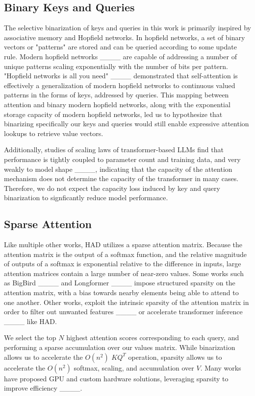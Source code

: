 \subsection{Binary Keys and Queries}
The selective binarization of keys and queries in this work is primarily inspired by associative memory and Hopfield networks.  In hopfield networks, a set of binary vectors or "patterns" are stored and can be queried according to some update rule.  Modern hopfield networks ____ are capable of addressing a number of unique patterns scaling exponentially with the number of bits per pattern. "Hopfield networks is all you need" ____ demonstrated that self-attention is effectively a generalization of modern hopfield networks to continuous valued patterns in the forms of keys, addressed by queries.  This mapping between attention and binary modern hopfield networks, along with the exponential storage capacity of modern hopfield networks, led us to hypothesize that binarizing specifically our keys and queries would still enable expressive attention lookups to retrieve value vectors.  \par Additionally, studies of scaling laws of transformer-based LLMs find that performance is tightly coupled to parameter count and training data, and very weakly to model shape ____, indicating that the capacity of the attention mechanism does not determine the capacity of the transformer in many cases.  Therefore, we do not expect the capacity loss induced by key and query binarization to signficantly reduce model performance.

\subsection{Sparse Attention}
Like multiple other works, HAD utilizes a sparse attention matrix.  Because the attention matrix is the output of a softmax function, and the relative magnitude of outputs of a softmax is exponential relative to the difference in inputs, large attention matrices contain a large number of near-zero values.  Some works such as BigBird ____ and Longformer ____ impose structured sparsity on the attention matrix, with a bias towards nearby elements being able to attend to one another.  Other works, exploit the intrinsic sparsity of the attention matrix in order to filter out unwanted features ____ or accelerate transformer inference ____ like HAD.  
\par We select the top $N$ highest attention scores corresponding to each query, and performing a sparse accumulation over our values matrix.  While binarization allows us to accelerate the $O(n^2)$ $K Q^T$ operation, sparsity allows us to accelerate the $O(n^2)$ softmax, scaling, and accumulation over $V$. Many works have proposed GPU and custom hardware solutions, leveraging sparsity to improve efficiency ____.